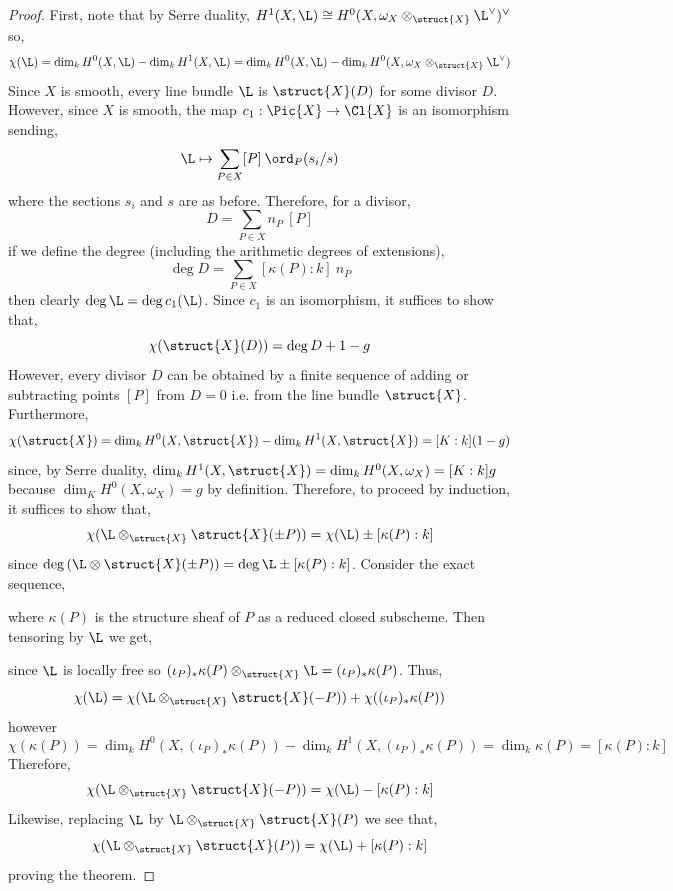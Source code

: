 \begin{proof}
First, note that by Serre duality, $H^1(X, \L) \cong H^0(X, \omega_X \otimes_{\struct{X}} \L^\vee)^\vee$ so,
\[ \chi(\L) = \dim_k H^0(X, \L) - \dim_k H^1(X, \L) = \dim_k H^0(X, \L) - \dim_k H^0(X, \omega_X \otimes_{\struct{X}} \L^\vee) \]
Since $X$ is smooth, every line bundle $\L$ is $\struct{X}(D)$ for some divisor $D$. However, since $X$ is smooth, the map $c_1 : \Pic{X} \to \Cl{X}$ is an isomorphism sending,
\[ \L \mapsto \sum_{P \in X} [P] \: \ord_{P}(s_i / s) \]
where the sections $s_i$ and $s$ are as before. Therefore, for a divisor,
\[ D = \sum_{P \in X} n_P \: [P] \]
if we define the degree (including the arithmetic degrees of extensions),
\[ \deg{D} = \sum_{P \in X} [\kappa(P) : k] \: n_P \]
then clearly $\deg{\L} = \deg{c_1(\L)}$. Since $c_1$ is an isomorphism, it suffices to show that,
\[ \chi(\struct{X}(D)) = \deg{D} + 1 - g \]
However, every divisor $D$ can be obtained by a finite sequence of adding or subtracting points $[P]$ from $D = 0$ i.e. from the line bundle $\struct{X}$. Furthermore,
\[ \chi(\struct{X}) = \dim_k H^0(X, \struct{X}) - \dim_k H^1(X, \struct{X}) = [K : k] (1 - g) \]
since, by Serre duality, $\dim_k H^1(X, \struct{X}) = \dim_k H^0(X, \omega_X) = [K : k] g$ because $\dim_K H^0(X, \omega_X) = g$ by definition. Therefore, to proceed by induction, it suffices to show that,
\[ \chi(\L \otimes_{\struct{X}} \struct{X}(\pm P)) = \chi(\L) \pm [\kappa(P) : k] \]
since $\deg{(\L \otimes \struct{X}(\pm P))} = \deg{\L} \pm [\kappa(P) : k]$. Consider the exact sequence,
\begin{center}
\end{center}
where $\kappa(P)$ is the structure sheaf of $P$ as a reduced closed subscheme. Then tensoring by $\L$ we get,
\begin{center}
\end{center}
since $\L$ is locally free so $(\iota_P)_* \kappa(P) \otimes_{\struct{X}} \L = (\iota_P)_* \kappa(P)$. Thus,
\[ \chi(\L) = \chi(\L \otimes_{\struct{X}} \struct{X}(-P)) + \chi((\iota_P)_* \kappa(P)) \]
however
\[ \chi(\kappa(P)) = \dim_k H^0(X, (\iota_P)_* \kappa(P)) - \dim_k H^1(X, (\iota_P)_* \kappa(P)) = \dim_k \kappa(P) = [\kappa(P) : k] \]
Therefore,
\[ \chi(\L \otimes_{\struct{X}} \struct{X}(-P)) = \chi(\L) - [\kappa(P) : k] \]
Likewise, replacing $\L$ by $\L \otimes_{\struct{X}} \struct{X}(P)$ we see that,
\[ \chi(\L \otimes_{\struct{X}} \struct{X}(P)) = \chi(\L) + [\kappa(P) : k] \]
proving the theorem. 
\end{proof}


